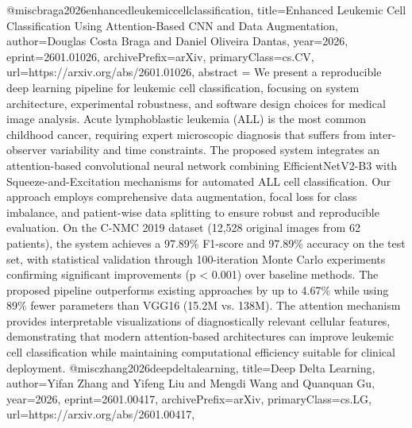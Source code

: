 {}@misc{braga2026enhancedleukemiccellclassification,
      title={Enhanced Leukemic Cell Classification Using Attention-Based CNN and Data Augmentation}, 
      author={Douglas Costa Braga and Daniel Oliveira Dantas},
      year={2026},
      eprint={2601.01026},
      archivePrefix={arXiv},
      primaryClass={cs.CV},
      url={https://arxiv.org/abs/2601.01026},
      abstract = {We present a reproducible deep learning pipeline for leukemic cell classification, focusing on system architecture, experimental robustness, and software design choices for medical image analysis. Acute lymphoblastic leukemia (ALL) is the most common childhood cancer, requiring expert microscopic diagnosis that suffers from inter-observer variability and time constraints. The proposed system integrates an attention-based convolutional neural network combining EfficientNetV2-B3 with Squeeze-and-Excitation mechanisms for automated ALL cell classification. Our approach employs comprehensive data augmentation, focal loss for class imbalance, and patient-wise data splitting to ensure robust and reproducible evaluation. On the C-NMC 2019 dataset (12,528 original images from 62 patients), the system achieves a 97.89\% F1-score and 97.89\% accuracy on the test set, with statistical validation through 100-iteration Monte Carlo experiments confirming significant improvements (p < 0.001) over baseline methods. The proposed pipeline outperforms existing approaches by up to 4.67\% while using 89\% fewer parameters than VGG16 (15.2M vs. 138M). The attention mechanism provides interpretable visualizations of diagnostically relevant cellular features, demonstrating that modern attention-based architectures can improve leukemic cell classification while maintaining computational efficiency suitable for clinical deployment.}
}@misc{zhang2026deepdeltalearning,
      title={Deep Delta Learning}, 
      author={Yifan Zhang and Yifeng Liu and Mengdi Wang and Quanquan Gu},
      year={2026},
      eprint={2601.00417},
      archivePrefix={arXiv},
      primaryClass={cs.LG},
      url={https://arxiv.org/abs/2601.00417},
}
